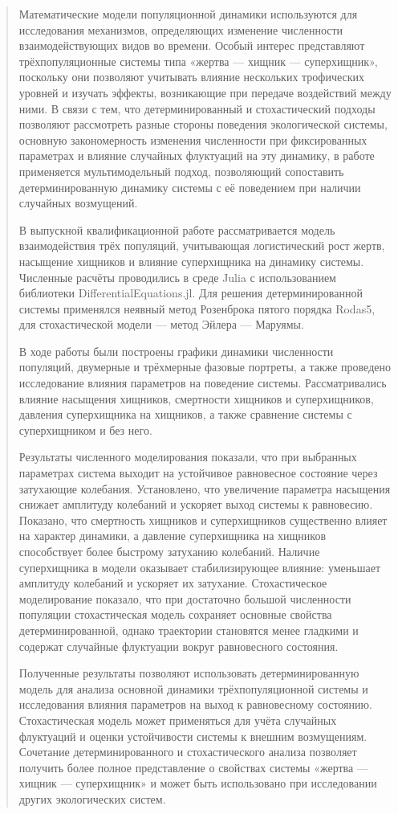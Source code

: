 \begin{abstract}
Математические модели популяционной динамики используются для исследования механизмов, определяющих изменение численности взаимодействующих видов во времени. Особый интерес представляют трёхпопуляционные системы типа «жертва — хищник — суперхищник», поскольку они позволяют учитывать влияние нескольких трофических уровней и изучать эффекты, возникающие при передаче воздействий между ними. В связи с тем, что детерминированный и стохастический подходы позволяют рассмотреть разные стороны поведения экологической системы, основную закономерность изменения численности при фиксированных параметрах и влияние случайных флуктуаций на эту динамику, в работе применяется мультимодельный подход, позволяющий сопоставить детерминированную динамику системы с её поведением при наличии случайных возмущений.


В выпускной квалификационной работе рассматривается модель взаимодействия трёх популяций, учитывающая логистический рост жертв, насыщение хищников и влияние суперхищника на динамику системы. Численные расчёты проводились в среде Julia с использованием библиотеки DifferentialEquations.jl. Для решения детерминированной системы применялся  неявный метод Розенброка пятого порядка Rodas5, для стохастической модели — метод Эйлера — Маруямы.

В ходе работы были построены графики динамики численности популяций, двумерные и трёхмерные фазовые портреты, а также проведено исследование влияния параметров на поведение системы. Рассматривались влияние насыщения хищников, смертности хищников и суперхищников, давления суперхищника на хищников, а также сравнение системы с суперхищником и без него.

Результаты численного моделирования показали, что при выбранных параметрах система выходит на устойчивое равновесное состояние через затухающие колебания. Установлено, что увеличение параметра насыщения снижает амплитуду колебаний и ускоряет выход системы к равновесию. Показано, что смертность хищников и суперхищников существенно влияет на характер динамики, а давление суперхищника на хищников способствует более быстрому затуханию колебаний. Наличие суперхищника в модели оказывает стабилизирующее влияние: уменьшает амплитуду колебаний и ускоряет их затухание.
Стохастическое моделирование показало, что при достаточно большой численности популяции стохастическая модель сохраняет основные свойства детерминированной, однако траектории становятся менее гладкими и содержат случайные флуктуации вокруг равновесного состояния.

Полученные результаты позволяют использовать детерминированную модель для анализа основной динамики трёхпопуляционной системы и исследования влияния параметров на выход к равновесному состоянию. Стохастическая модель может применяться для учёта случайных флуктуаций и оценки устойчивости системы к внешним возмущениям. Сочетание детерминированного и стохастического анализа позволяет получить более полное представление о свойствах системы «жертва — хищник — суперхищник» и может быть использовано при исследовании других экологических систем.
\end{abstract}

